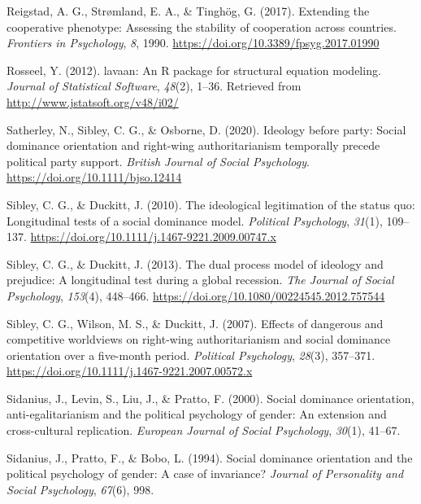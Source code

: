 \documentclass[
  man,floatsintext]{apa6}
\newlength{\cslhangindent}
\newlength{\cslentryspacingunit} %
\newenvironment{CSLReferences}[2] %
 {%
  \setlength{\parindent}{0pt}
  \ifodd #1
  \let\oldpar\par
  \def\par{\hangindent=\cslhangindent\oldpar}
  \fi
  \setlength{\parskip}{#2\cslentryspacingunit}
 }%
 {}
\begin{document}
\begin{CSLReferences}{1}{0}
\leavevmode{}%
Reigstad, A. G., Strømland, E. A., \& Tinghög, G. (2017). Extending the cooperative phenotype: Assessing the stability of cooperation across countries. \emph{Frontiers in Psychology}, \emph{8}, 1990. \url{https://doi.org/10.3389/fpsyg.2017.01990}

\leavevmode{}%
Rosseel, Y. (2012). {lavaan}: An {R} package for structural equation modeling. \emph{Journal of Statistical Software}, \emph{48}(2), 1--36. Retrieved from \url{http://www.jstatsoft.org/v48/i02/}

\leavevmode{}%
Satherley, N., Sibley, C. G., \& Osborne, D. (2020). Ideology before party: Social dominance orientation and right-wing authoritarianism temporally precede political party support. \emph{British Journal of Social Psychology}. \url{https://doi.org/10.1111/bjso.12414}

\leavevmode{}%
Sibley, C. G., \& Duckitt, J. (2010). The ideological legitimation of the status quo: Longitudinal tests of a social dominance model. \emph{Political Psychology}, \emph{31}(1), 109--137. \url{https://doi.org/10.1111/j.1467-9221.2009.00747.x}

\leavevmode{}%
Sibley, C. G., \& Duckitt, J. (2013). The dual process model of ideology and prejudice: A longitudinal test during a global recession. \emph{The Journal of Social Psychology}, \emph{153}(4), 448--466. \url{https://doi.org/10.1080/00224545.2012.757544}

\leavevmode{}%
Sibley, C. G., Wilson, M. S., \& Duckitt, J. (2007). Effects of dangerous and competitive worldviews on right-wing authoritarianism and social dominance orientation over a five-month period. \emph{Political Psychology}, \emph{28}(3), 357--371. \url{https://doi.org/10.1111/j.1467-9221.2007.00572.x}

\leavevmode{}%
Sidanius, J., Levin, S., Liu, J., \& Pratto, F. (2000). Social dominance orientation, anti-egalitarianism and the political psychology of gender: An extension and cross-cultural replication. \emph{European Journal of Social Psychology}, \emph{30}(1), 41--67.

\leavevmode{}%
Sidanius, J., Pratto, F., \& Bobo, L. (1994). Social dominance orientation and the political psychology of gender: A case of invariance? \emph{Journal of Personality and Social Psychology}, \emph{67}(6), 998.


\end{CSLReferences}
\end{document}
